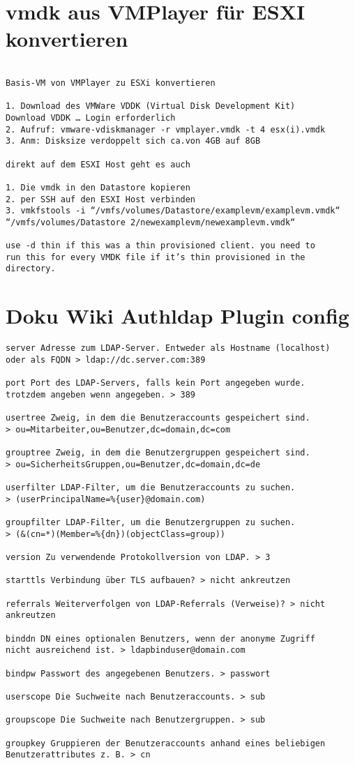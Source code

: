 \documentclass[a4paper,10pt]{report}
\begin{document}
\section{vmdk aus VMPlayer für ESXI konvertieren}
\begin{verbatim}

Basis-VM von VMPlayer zu ESXi konvertieren

1. Download des VMWare VDDK (Virtual Disk Development Kit) 
Download VDDK … Login erforderlich
2. Aufruf: vmware-vdiskmanager -r vmplayer.vmdk -t 4 esx(i).vmdk
3. Anm: Disksize verdoppelt sich ca.von 4GB auf 8GB

direkt auf dem ESXI Host geht es auch

1. Die vmdk in den Datastore kopieren
2. per SSH auf den ESXI Host verbinden
3. vmkfstools -i “/vmfs/volumes/Datastore/examplevm/examplevm.vmdk“ 
“/vmfs/volumes/Datastore 2/newexamplevm/newexamplevm.vmdk“

use -d thin if this was a thin provisioned client. you need to 
run this for every VMDK file if it’s thin provisioned in the directory. 

\end{verbatim}
\pagebreak

\section{Doku Wiki Authldap Plugin config}
\begin{verbatim}
server Adresse zum LDAP-Server. Entweder als Hostname (localhost)
oder als FQDN > ldap://dc.server.com:389

port Port des LDAP-Servers, falls kein Port angegeben wurde. 
trotzdem angeben wenn angegeben. > 389

usertree Zweig, in dem die Benutzeraccounts gespeichert sind.
> ou=Mitarbeiter,ou=Benutzer,dc=domain,dc=com    

grouptree Zweig, in dem die Benutzergruppen gespeichert sind. 
> ou=SicherheitsGruppen,ou=Benutzer,dc=domain,dc=de

userfilter LDAP-Filter, um die Benutzeraccounts zu suchen.
> (userPrincipalName=%{user}@domain.com)

groupfilter LDAP-Filter, um die Benutzergruppen zu suchen. 
> (&(cn=*)(Member=%{dn})(objectClass=group))

version Zu verwendende Protokollversion von LDAP. > 3   

starttls Verbindung über TLS aufbauen? > nicht ankreutzen 

referrals Weiterverfolgen von LDAP-Referrals (Verweise)? > nicht ankreutzen

binddn DN eines optionalen Benutzers, wenn der anonyme Zugriff 
nicht ausreichend ist. > ldapbinduser@domain.com

bindpw Passwort des angegebenen Benutzers. > passwort

userscope Die Suchweite nach Benutzeraccounts. > sub

groupscope Die Suchweite nach Benutzergruppen. > sub

groupkey Gruppieren der Benutzeraccounts anhand eines beliebigen 
Benutzerattributes z. B. > cn

\end{verbatim}
\end{document}
